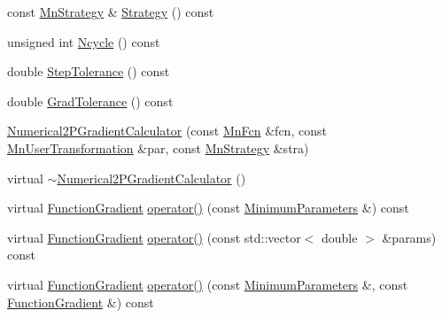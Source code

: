 \begin{DoxyCompactItemize}
\item 
const \mbox{\hyperlink{classROOT_1_1Minuit2_1_1MnStrategy}{Mn\+Strategy}} \& \mbox{\hyperlink{classROOT_1_1Minuit2_1_1Numerical2PGradientCalculator_a71eb0622c53ddf5d3d319fa676cbbd6e}{Strategy}} () const
\item 
unsigned int \mbox{\hyperlink{classROOT_1_1Minuit2_1_1Numerical2PGradientCalculator_ace5b19ee0df4e3cd09333f519112d2b3}{Ncycle}} () const
\item 
double \mbox{\hyperlink{classROOT_1_1Minuit2_1_1Numerical2PGradientCalculator_afb1bbda7e079db02b02b790e0b0f6cca}{Step\+Tolerance}} () const
\item 
double \mbox{\hyperlink{classROOT_1_1Minuit2_1_1Numerical2PGradientCalculator_aa0011cbece7254c7e17f053916e01c65}{Grad\+Tolerance}} () const
\item 
\mbox{\hyperlink{classROOT_1_1Minuit2_1_1Numerical2PGradientCalculator_ab9e5f93630233d189cb8856753a2cff8}{Numerical2\+P\+Gradient\+Calculator}} (const \mbox{\hyperlink{classROOT_1_1Minuit2_1_1MnFcn}{Mn\+Fcn}} \&fcn, const \mbox{\hyperlink{classROOT_1_1Minuit2_1_1MnUserTransformation}{Mn\+User\+Transformation}} \&par, const \mbox{\hyperlink{classROOT_1_1Minuit2_1_1MnStrategy}{Mn\+Strategy}} \&stra)
\item 
virtual \mbox{\hyperlink{classROOT_1_1Minuit2_1_1Numerical2PGradientCalculator_a9e82d6d064c232e74fc49e2262ebb597}{$\sim$\+Numerical2\+P\+Gradient\+Calculator}} ()
\item 
virtual \mbox{\hyperlink{classROOT_1_1Minuit2_1_1FunctionGradient}{Function\+Gradient}} \mbox{\hyperlink{classROOT_1_1Minuit2_1_1Numerical2PGradientCalculator_a8c90cd467631ecc4cac72187de948b05}{operator()}} (const \mbox{\hyperlink{classROOT_1_1Minuit2_1_1MinimumParameters}{Minimum\+Parameters}} \&) const
\item 
virtual \mbox{\hyperlink{classROOT_1_1Minuit2_1_1FunctionGradient}{Function\+Gradient}} \mbox{\hyperlink{classROOT_1_1Minuit2_1_1Numerical2PGradientCalculator_a213b721d22f8c8f91d85841d7ee1a000}{operator()}} (const std\+::vector$<$ double $>$ \&params) const
\item 
virtual \mbox{\hyperlink{classROOT_1_1Minuit2_1_1FunctionGradient}{Function\+Gradient}} \mbox{\hyperlink{classROOT_1_1Minuit2_1_1Numerical2PGradientCalculator_a9ca27ef0f61a678b528f32a002e8002b}{operator()}} (const \mbox{\hyperlink{classROOT_1_1Minuit2_1_1MinimumParameters}{Minimum\+Parameters}} \&, const \mbox{\hyperlink{classROOT_1_1Minuit2_1_1FunctionGradient}{Function\+Gradient}} \&) const
\item 

\end{DoxyCompactItemize}
